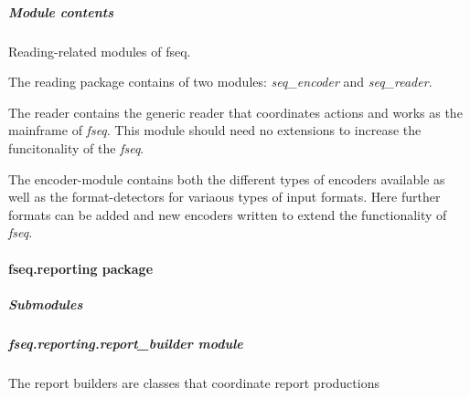 \documentclass[letterpaper,10pt,english]{sphinxmanual}
\begin{document}
\subparagraph{Module contents}
\label{fseq.reading:module-fseq.reading}\label{fseq.reading:module-contents}
Reading-related modules of fseq.

The reading package contains of two modules: \emph{seq\_encoder} and \emph{seq\_reader}.

The reader contains the generic reader that coordinates actions and works as
the mainframe of \emph{fseq}.
This module should need no extensions to increase the funcitonality of the
\emph{fseq}.

The encoder-module contains both the different types of encoders available as
well as the format-detectors for variaous types of input formats.
Here further formats can be added and new encoders written to extend the 
functionality of \emph{fseq}.


\paragraph{fseq.reporting package}
\label{fseq.reporting::doc}\label{fseq.reporting:fseq-reporting-package}

\subparagraph{Submodules}
\label{fseq.reporting:submodules}

\subparagraph{fseq.reporting.report\_builder module}
\label{fseq.reporting:module-fseq.reporting.report_builder}\label{fseq.reporting:fseq-reporting-report-builder-module}
The report builders are classes that coordinate report productions
\end{document}
